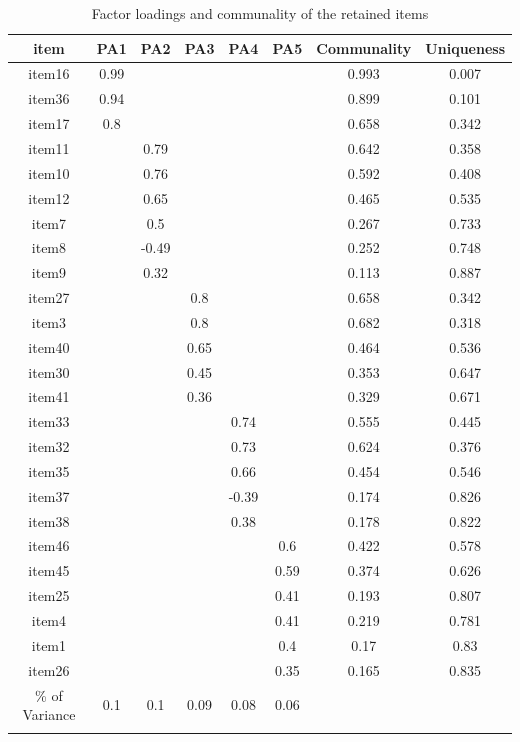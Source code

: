 \documentclass[
  english,
  man]{apa6}
\begin{document}
\begin{table}[tbp]

\begin{center}
\begin{threeparttable}

\caption{\label{tab:EFATable}Factor loadings and communality of the retained items}

\small{

\begin{tabular}{cccccccc}
\toprule
item & \multicolumn{1}{c}{PA1} & \multicolumn{1}{c}{PA2} & \multicolumn{1}{c}{PA3} & \multicolumn{1}{c}{PA4} & \multicolumn{1}{c}{PA5} & \multicolumn{1}{c}{Communality} & \multicolumn{1}{c}{Uniqueness}\\
\midrule
item16 & 0.99 &  &  &  &  & 0.993 & 0.007\\
item36 & 0.94 &  &  &  &  & 0.899 & 0.101\\
item17 & 0.8 &  &  &  &  & 0.658 & 0.342\\
item11 &  & 0.79 &  &  &  & 0.642 & 0.358\\
item10 &  & 0.76 &  &  &  & 0.592 & 0.408\\
item12 &  & 0.65 &  &  &  & 0.465 & 0.535\\
item7 &  & 0.5 &  &  &  & 0.267 & 0.733\\
item8 &  & -0.49 &  &  &  & 0.252 & 0.748\\
item9 &  & 0.32 &  &  &  & 0.113 & 0.887\\
item27 &  &  & 0.8 &  &  & 0.658 & 0.342\\
item3 &  &  & 0.8 &  &  & 0.682 & 0.318\\
item40 &  &  & 0.65 &  &  & 0.464 & 0.536\\
item30 &  &  & 0.45 &  &  & 0.353 & 0.647\\
item41 &  &  & 0.36 &  &  & 0.329 & 0.671\\
item33 &  &  &  & 0.74 &  & 0.555 & 0.445\\
item32 &  &  &  & 0.73 &  & 0.624 & 0.376\\
item35 &  &  &  & 0.66 &  & 0.454 & 0.546\\
item37 &  &  &  & -0.39 &  & 0.174 & 0.826\\
item38 &  &  &  & 0.38 &  & 0.178 & 0.822\\
item46 &  &  &  &  & 0.6 & 0.422 & 0.578\\
item45 &  &  &  &  & 0.59 & 0.374 & 0.626\\
item25 &  &  &  &  & 0.41 & 0.193 & 0.807\\
item4 &  &  &  &  & 0.41 & 0.219 & 0.781\\
item1 &  &  &  &  & 0.4 & 0.17 & 0.83\\
item26 &  &  &  &  & 0.35 & 0.165 & 0.835\\
\% of Variance & 0.1 & 0.1 & 0.09 & 0.08 & 0.06 &  & \\
\bottomrule
\addlinespace
\end{tabular}

}
\end{threeparttable}
\end{center}
\end{table}
\end{document}
